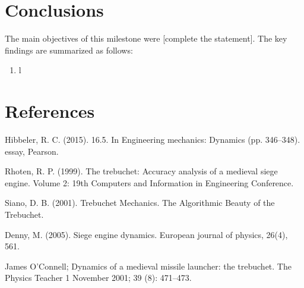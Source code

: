 \documentclass[12pt, titlepage]{article}
\begin{document}
    \section{Conclusions}
    The main objectives of this milestone were [complete the statement].
    The key findings are summarized as follows:
    \begin{enumerate}
        \item l
    \end{enumerate}
    \newpage
    \section{References}
        \hspace{15pt}Hibbeler, R. C. (2015). 16.5. In Engineering mechanics: Dynamics (pp. 346–348). essay, Pearson.

        Rhoten, R. P. (1999). The trebuchet: Accuracy analysis of a medieval siege engine. Volume 2: 19th Computers and Information in Engineering Conference.

        Siano, D. B. (2001). Trebuchet Mechanics. The Algorithmic Beauty of the Trebuchet.

        Denny, M. (2005). Siege engine dynamics. European journal of physics, 26(4), 561.

        James O'Connell; Dynamics of a medieval missile launcher: the trebuchet. The Physics
        Teacher 1 November 2001; 39 (8): 471–473.
    \newpage
\end{document}
